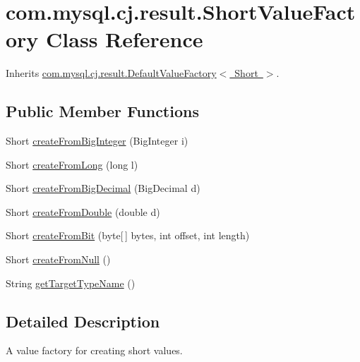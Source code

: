 \hypertarget{classcom_1_1mysql_1_1cj_1_1result_1_1_short_value_factory}{}\section{com.\+mysql.\+cj.\+result.\+Short\+Value\+Factory Class Reference}
\label{classcom_1_1mysql_1_1cj_1_1result_1_1_short_value_factory}


Inherits \mbox{\hyperlink{classcom_1_1mysql_1_1cj_1_1result_1_1_default_value_factory}{com.\+mysql.\+cj.\+result.\+Default\+Value\+Factory$<$ Short $>$}}.

\subsection*{Public Member Functions}
\begin{DoxyCompactItemize}
\item 
Short \mbox{\hyperlink{classcom_1_1mysql_1_1cj_1_1result_1_1_short_value_factory_a0aa9b8fe3a70ebcaa91b3c961064780b}{create\+From\+Big\+Integer}} (Big\+Integer i)
\item 
Short \mbox{\hyperlink{classcom_1_1mysql_1_1cj_1_1result_1_1_short_value_factory_a2170932ba802d33d6f3628cc82b035e5}{create\+From\+Long}} (long l)
\item 
Short \mbox{\hyperlink{classcom_1_1mysql_1_1cj_1_1result_1_1_short_value_factory_abc8e5aff416075b50c3e3088e8bb09e7}{create\+From\+Big\+Decimal}} (Big\+Decimal d)
\item 
Short \mbox{\hyperlink{classcom_1_1mysql_1_1cj_1_1result_1_1_short_value_factory_ad828351339c467488179817a62caab37}{create\+From\+Double}} (double d)
\item 
Short \mbox{\hyperlink{classcom_1_1mysql_1_1cj_1_1result_1_1_short_value_factory_ad82a2b024ca66fc629addeba1dc3ffe1}{create\+From\+Bit}} (byte\mbox{[}$\,$\mbox{]} bytes, int offset, int length)
\item 
Short \mbox{\hyperlink{classcom_1_1mysql_1_1cj_1_1result_1_1_short_value_factory_afa8ffda4b6a1c8421c6fe871d2168675}{create\+From\+Null}} ()
\item 
String \mbox{\hyperlink{classcom_1_1mysql_1_1cj_1_1result_1_1_short_value_factory_a7e17ae9199e54664032a032e35e1e525}{get\+Target\+Type\+Name}} ()
\end{DoxyCompactItemize}


\subsection{Detailed Description}
A value factory for creating short values. 

